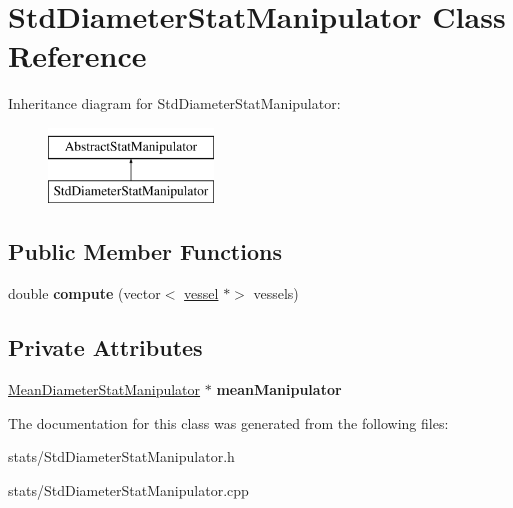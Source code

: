\hypertarget{class_std_diameter_stat_manipulator}{}\section{Std\+Diameter\+Stat\+Manipulator Class Reference}
\label{class_std_diameter_stat_manipulator}
Inheritance diagram for Std\+Diameter\+Stat\+Manipulator\+:\begin{figure}[H]
\begin{center}
\leavevmode
\includegraphics[height=2.000000cm]{d1/dca/class_std_diameter_stat_manipulator}
\end{center}
\end{figure}
\subsection*{Public Member Functions}
\begin{DoxyCompactItemize}
\item 
\mbox{\label{class_std_diameter_stat_manipulator_ac27e5382f27a75b4d6948f51b96f4705}} 
double {\bfseries compute} (vector$<$ \mbox{\hyperlink{structvessel}{vessel}} $\ast$$>$ vessels)
\end{DoxyCompactItemize}
\subsection*{Private Attributes}
\begin{DoxyCompactItemize}
\item 
\mbox{\label{class_std_diameter_stat_manipulator_aadcb4a49eddfbc2cb154bb156da65beb}} 
\mbox{\hyperlink{class_mean_diameter_stat_manipulator}{Mean\+Diameter\+Stat\+Manipulator}} $\ast$ {\bfseries mean\+Manipulator}
\end{DoxyCompactItemize}


The documentation for this class was generated from the following files\+:\begin{DoxyCompactItemize}
\item 
stats/Std\+Diameter\+Stat\+Manipulator.\+h\item 
stats/Std\+Diameter\+Stat\+Manipulator.\+cpp\end{DoxyCompactItemize}
